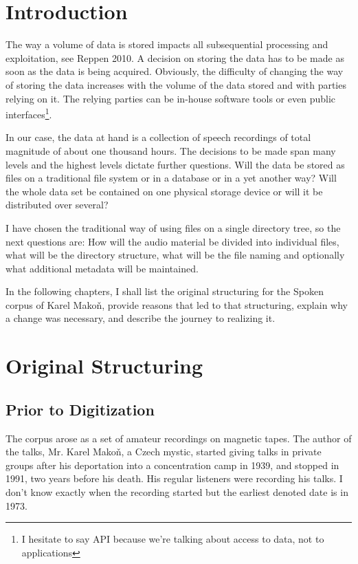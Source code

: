 
\begin{abstract}
\end{abstract}

\section{Introduction}

The way a volume of data is stored impacts all subsequential processing and
exploitation, see Reppen 2010\cite{reppen2010building}.
A decision on storing the data has to be made as soon as the data
is being acquired. Obviously, the difficulty of changing the way of storing the
data increases with the volume of the data stored and with parties relying on
it. The relying parties can be in-house software tools or even public
interfaces\footnote{I hesitate to say API because we're talking about access to
data, not to applications}.

In our case, the data at hand is a collection of speech recordings of total
magnitude of about one thousand hours. The decisions to be made span many
levels and the highest levels dictate further questions. Will the data be stored
as files on a traditional file system or in a database or in a yet another way?
Will the whole data set be contained on one physical storage device or will it
be distributed over several?

I have chosen the traditional way of using files on a single directory tree, so
the next questions are: How will the audio material be divided into individual
files, what will be the directory structure, what will be the file naming and
optionally what additional metadata will be maintained.

In the following chapters, I shall list the original structuring for the Spoken
corpus of Karel Makoň, provide reasons that led to that structuring, explain why
a change was necessary, and describe the journey to realizing it.

\section{Original Structuring}

\subsection{Prior to Digitization}

The corpus arose as a set of amateur recordings on magnetic tapes. The author of
the talks, Mr. Karel Makoň, a Czech mystic, started giving talks in private
groups after his deportation into a concentration camp in 1939, and stopped in
1991, two years before his death. His regular listeners were recording his
talks. I don't know exactly when the recording started but the earliest denoted
date is in 1973.

